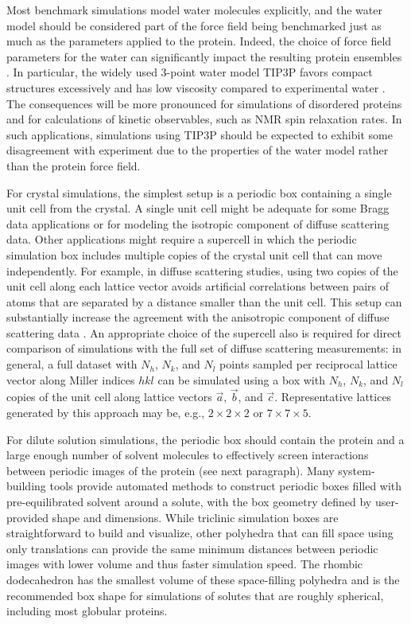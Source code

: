 \documentclass[9pt,review,pubversion]{livecoms}
\begin{document}
Most benchmark simulations model water molecules explicitly, and the water model should be considered part of the force field being benchmarked just as much as the parameters applied to the protein.
Indeed, the choice of force field parameters for the water can significantly impact the resulting protein ensembles \cite{piana_water_2015,tian_ff19sb_2020,coppa_accelerated_2023}.
In particular, the widely used 3-point water model TIP3P \cite{jorgensen_comparison_1983} favors compact structures excessively \cite{tian_ff19sb_2020,coppa_accelerated_2023} and has low viscosity compared to experimental water \cite{kadaoluwa_pathirannahalage_systematic_2021}.
The consequences will be more pronounced for simulations of disordered proteins and for calculations of kinetic observables, such as NMR spin relaxation rates.
In such applications, simulations using TIP3P should be expected to exhibit some disagreement with experiment due to the properties of the water model rather than the protein force field.

For crystal simulations, the simplest setup is a periodic box containing a single unit cell from the crystal.
A single unit cell might be adequate for some Bragg data applications or for modeling the isotropic component of diffuse scattering data. 
Other applications might require a supercell in which the periodic simulation box includes multiple copies of the crystal unit cell that can move independently.
For example, in diffuse scattering studies, using two copies of the unit cell along each lattice vector avoids artificial correlations between pairs of atoms that are separated by a distance smaller than the unit cell.
This setup can substantially increase the agreement with the anisotropic component of diffuse scattering data \cite{wall_internal_2018}.
An appropriate choice of the supercell also is required for direct comparison of simulations with the full set of diffuse scattering measurements: in general, a full dataset with $N_h$, $N_k$, and $N_l$ points sampled per reciprocal lattice vector along Miller indices $hkl$ can be simulated using a box with $N_h$, $N_k$, and $N_l$ copies of the unit cell along lattice vectors $\vec{a}$, $\vec{b}$, and $\vec{c}$.
Representative lattices generated by this approach may be, e.g., $2 \times 2 \times 2$ or $7 \times 7 \times 5$.

For dilute solution simulations, the periodic box should contain the protein and a large enough number of solvent molecules to effectively screen interactions between periodic images of the protein (see next paragraph).
Many system-building tools provide automated methods to construct periodic boxes filled with pre-equilibrated solvent around a solute, with the box geometry defined by user-provided shape and dimensions.
While triclinic simulation boxes are straightforward to build and visualize, other polyhedra that can fill space using only translations can provide the same minimum distances between periodic images with lower volume and thus faster simulation speed.
The rhombic dodecahedron \cite{wang_superposition_1972} has the smallest volume of these space-filling polyhedra and is the recommended box shape for simulations of solutes that are roughly spherical, including most globular proteins.
\end{document}
